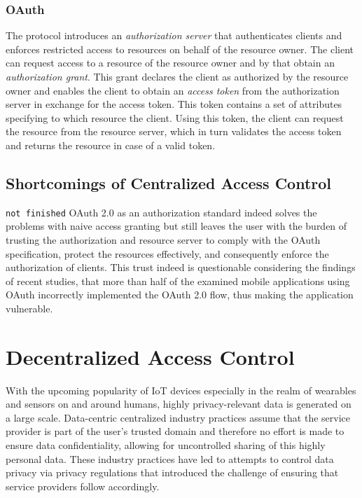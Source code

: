 \documentclass[conference]{IEEEtran}
\begin{document}
\subsubsection*{OAuth}
The protocol introduces an \textit{authorization server} that authenticates clients and enforces restricted access to resources on behalf of the resource owner.
The client can request access to a resource of the resource owner and by that obtain an \textit{authorization grant}.
This grant declares the client as authorized by the resource owner and enables the client to obtain an \textit{access token} from the authorization server in exchange for the access token.
This token contains a set of attributes specifying to which resource the client.
Using this token, the client can request the resource from the resource server, which in turn validates the access token and returns the resource in case of a valid token. \cite{hardt_oauth_2012}

\subsection{Shortcomings of Centralized Access Control}
\texttt{not finished} %
OAuth 2.0 as an authorization standard indeed solves the problems with naive access granting but still leaves the user with the burden of trusting the authorization and resource server to comply with the OAuth specification, protect the resources effectively, and consequently enforce the authorization of clients.
This trust indeed is questionable considering the findings of recent studies, that more than half of the examined mobile applications using OAuth incorrectly implemented the OAuth 2.0 flow, thus making the application vulnerable. \cite{chen_oauth_2014}

\section{Decentralized Access Control}
With the upcoming popularity of IoT devices especially in the realm of wearables and sensors on and around humans, highly privacy-relevant data is generated on a large scale. \cite{zhang_cloud_2015}
Data-centric centralized industry practices assume that the service provider is part of the user's trusted domain and therefore no effort is made to ensure data confidentiality, allowing for uncontrolled sharing of this highly personal data. \cite{shafagh_droplet_2020}
These industry practices have led to attempts to control data privacy via privacy regulations that introduced the challenge of ensuring that service providers follow accordingly. \cite{noauthor_general_nodate}
\end{document}
